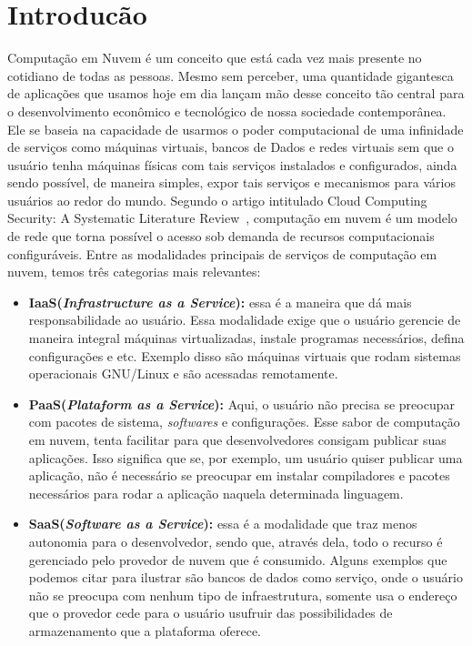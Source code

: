 \documentclass[11pt,twoside]{article}
\begin{document}
\section{Introducão}

Computação em Nuvem é um conceito que está cada vez mais presente no cotidiano de todas as pessoas. Mesmo sem perceber, uma quantidade gigantesca de aplicações que usamos hoje 
em dia lançam mão desse conceito tão central para o desenvolvimento econômico e tecnológico de nossa sociedade contemporânea. Ele se baseia na capacidade de usarmos o
poder computacional de uma infinidade de serviços como máquinas virtuais, bancos de Dados e redes virtuais sem que o usuário tenha máquinas físicas com tais serviços 
instalados e configurados, ainda sendo possível, de maneira simples, expor tais serviços e mecanismos para vários usuários ao redor do mundo. Segundo o artigo intitulado Cloud Computing Security: A
Systematic Literature Review~\cite{UPP}, computação em nuvem é um modelo de rede que torna possível o acesso sob demanda de recursos computacionais configuráveis.
Entre as modalidades principais de serviços de computação em nuvem, temos três categorias mais relevantes:

\begin{itemize}

  \item \textbf{IaaS(\emph{Infrastructure as a Service}):} essa é a maneira que dá mais responsabilidade ao usuário. Essa modalidade exige que o usuário gerencie de maneira integral máquinas virtualizadas, 
  instale programas necessários, defina configurações e etc. Exemplo disso são máquinas virtuais que rodam sistemas operacionais GNU/Linux e são acessadas remotamente.
  \item \textbf{PaaS(\emph{Plataform as a Service}):} Aqui, o usuário não precisa se preocupar com pacotes de sistema, \emph{softwares} e configurações. Esse sabor de computação em nuvem, tenta 
  facilitar para que desenvolvedores consigam publicar suas aplicações. Isso significa que se, por exemplo, um usuário quiser publicar uma aplicação, não é necessário se preocupar em
  instalar compiladores e pacotes necessários para rodar a aplicação naquela determinada linguagem.
  \item \textbf{SaaS(\emph{Software as a Service}):} essa é a modalidade que traz menos autonomia para o desenvolvedor, sendo que, através dela, todo o recurso é gerenciado pelo provedor de 
  nuvem que é consumido. Alguns exemplos que podemos citar para ilustrar são bancos de dados como serviço, onde o usuário não se preocupa com nenhum tipo de infraestrutura, 
  somente usa o endereço que o provedor cede para o usuário usufruir das possibilidades de armazenamento que a plataforma oferece.

\end{itemize}
\end{document}
